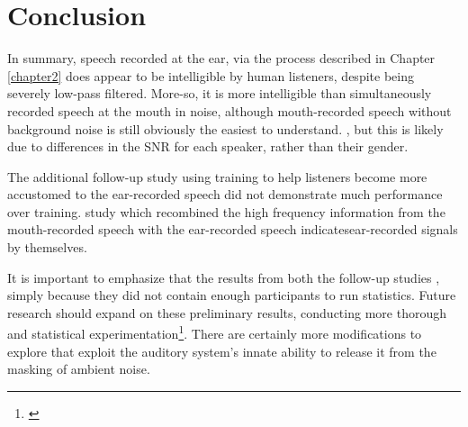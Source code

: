 \section{Conclusion}

In summary, speech recorded at the ear, via the process described in Chapter \DIFdelbegin {}\DIFdelend \ref{chapter2} does appear to be intelligible by human listeners, despite being severely low-pass filtered.  More-so, it is more intelligible than simultaneously recorded speech at the mouth in noise, although mouth-recorded speech without background noise is still obviously the easiest to understand.  \DIFdelbegin {}\DIFdelend \DIFaddbegin {}\DIFaddend , but this is likely due to differences in the SNR for each speaker, rather than their gender.  

The additional follow-up study using training to help listeners become more accustomed to the ear-recorded speech did not demonstrate much performance over training.  \DIFdelbegin {}\DIFdelend \DIFaddbegin {}\DIFaddend study which recombined the high frequency information from the mouth-recorded speech with the \DIFdelbegin {}\DIFdelend \DIFaddbegin {}\DIFaddend ear-recorded speech indicates\DIFdelbegin {}\DIFdelend \DIFaddbegin {}\DIFaddend ear-recorded signals by themselves.

It is important to emphasize that the results from both the follow-up studies \DIFdelbegin {}\DIFdelend \DIFaddbegin {}\DIFaddend , simply because they did not contain enough participants to run statistics.  Future research should expand on these preliminary results, conducting more thorough and statistical experimentation\footnote{\DIFdelbegin \textbf{}%
\DIFdelend \DIFaddbegin {}\DIFaddend }.  There are certainly more \DIFdelbegin {}\DIFdelend \DIFaddbegin {}\DIFaddend modifications to explore that exploit the auditory system's innate ability to release it from the masking of ambient noise.

% 
% 
% 
